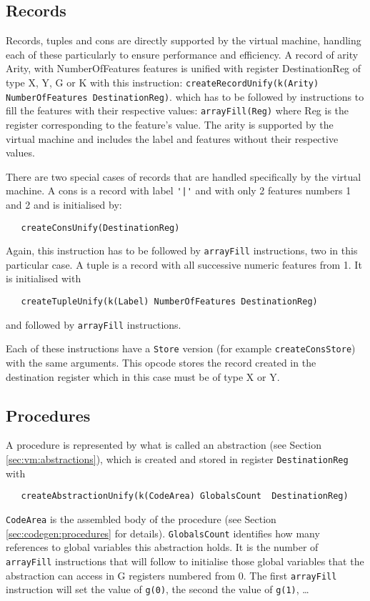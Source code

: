 \documentclass[a4paper]{memoir}
\begin{document}
\subsection{Records}\label{sec:opcode:records}
Records, tuples and cons are directly supported by the virtual machine, handling each of these particularly to ensure performance and efficiency.
A record of arity Arity, with NumberOfFeatures features is unified with register
DestinationReg of type X, Y, G or K with this instruction:
\lstinline!createRecordUnify(k(Arity) NumberOfFeatures DestinationReg)!. which has to be followed by instructions to fill the features with their respective values:
\lstinline!arrayFill(Reg)! where Reg is the register corresponding to the feature's value.
The arity is supported by the virtual machine and includes the label and features without their respective values.

There are two special cases of records that are handled specifically by the virtual machine.
A cons is a record with label \lstinline!'|'! and with only 2 features numbers 1
and 2 and is initialised by:
\begin{lstlisting}
   createConsUnify(DestinationReg)
\end{lstlisting}
Again, this instruction has to be
followed by \lstinline!arrayFill! instructions, two in this particular case.
A tuple is a record with all successive numeric features from 1. It is initialised with 
\begin{lstlisting}
   createTupleUnify(k(Label) NumberOfFeatures DestinationReg)
\end{lstlisting}
and followed by \lstinline!arrayFill! instructions.

Each of these instructions have a \lstinline!Store! version (for example
\lstinline!createConsStore!) with the same arguments. This opcode stores the
record created in the destination register which in this case must be of type X
or Y.

\subsection{Procedures}\label{sec:opcode:procedures}
A procedure is represented by what is called an abstraction (see Section
\ref{sec:vm:abstractions}), which is created and stored in register
\lstinline!DestinationReg! with
\begin{lstlisting}
   createAbstractionUnify(k(CodeArea) GlobalsCount  DestinationReg)
\end{lstlisting}
\lstinline!CodeArea! is the assembled body of the procedure (see Section
\ref{sec:codegen:procedures} for details). \lstinline!GlobalsCount! identifies
how many references to global variables this abstraction holds. It is the number
of \lstinline!arrayFill! instructions that will follow to initialise those global variables
that the abstraction can access in G registers numbered from 0. The first
\lstinline!arrayFill! instruction will set the value of \lstinline!g(0)!, the
second the value of \lstinline!g(1)!,
\ldots
\end{document}

